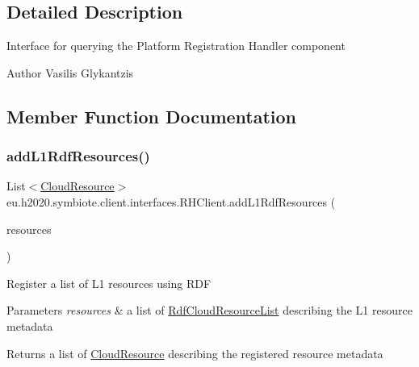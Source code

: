 \subsection{Detailed Description}
Interface for querying the Platform Registration Handler component

\begin{DoxyAuthor}{Author}
Vasilis Glykantzis 
\end{DoxyAuthor}


\subsection{Member Function Documentation}
\mbox{\label{interfaceeu_1_1h2020_1_1symbiote_1_1client_1_1interfaces_1_1RHClient_a63d6d5525a8d7cc6b046dbd6229fddb4}} 
\subsubsection{\texorpdfstring{add\+L1\+Rdf\+Resources()}{addL1RdfResources()}}
{\footnotesize\ttfamily List$<$\hyperlink{classeu_1_1h2020_1_1symbiote_1_1cloud_1_1model_1_1internal_1_1CloudResource}{Cloud\+Resource}$>$ eu.\+h2020.\+symbiote.\+client.\+interfaces.\+R\+H\+Client.\+add\+L1\+Rdf\+Resources (\begin{DoxyParamCaption}\item[{\hyperlink{classeu_1_1h2020_1_1symbiote_1_1cloud_1_1model_1_1internal_1_1RdfCloudResourceList}{Rdf\+Cloud\+Resource\+List}}]{resources }\end{DoxyParamCaption})}

Register a list of L1 resources using R\+DF


\begin{DoxyParams}{Parameters}
{\em resources} & a list of \hyperlink{}{Rdf\+Cloud\+Resource\+List} describing the L1 resource metadata \\
\hline
\end{DoxyParams}
\begin{DoxyReturn}{Returns}
a list of \hyperlink{}{Cloud\+Resource} describing the registered resource metadata 
\end{DoxyReturn}


